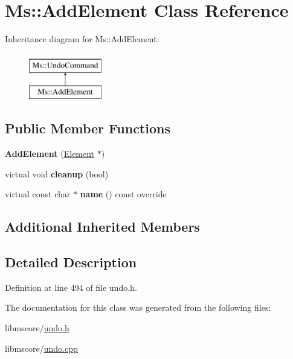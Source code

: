 \hypertarget{class_ms_1_1_add_element}{}\section{Ms\+:\+:Add\+Element Class Reference}
\label{class_ms_1_1_add_element}
Inheritance diagram for Ms\+:\+:Add\+Element\+:\begin{figure}[H]
\begin{center}
\leavevmode
\includegraphics[height=2.000000cm]{class_ms_1_1_add_element}
\end{center}
\end{figure}
\subsection*{Public Member Functions}
\begin{DoxyCompactItemize}
\item 
\mbox{\label{class_ms_1_1_add_element_a590df0e3c8282928f7bacc902b90aeff}} 
{\bfseries Add\+Element} (\hyperlink{class_ms_1_1_element}{Element} $\ast$)
\item 
\mbox{\label{class_ms_1_1_add_element_a1e2c10c5bef9616b96d7b1090f727600}} 
virtual void {\bfseries cleanup} (bool)
\item 
\mbox{\label{class_ms_1_1_add_element_a2179741699322a5dec8cc748f8132359}} 
virtual const char $\ast$ {\bfseries name} () const override
\end{DoxyCompactItemize}
\subsection*{Additional Inherited Members}


\subsection{Detailed Description}


Definition at line 494 of file undo.\+h.



The documentation for this class was generated from the following files\+:\begin{DoxyCompactItemize}
\item 
libmscore/\hyperlink{undo_8h}{undo.\+h}\item 
libmscore/\hyperlink{undo_8cpp}{undo.\+cpp}\end{DoxyCompactItemize}
